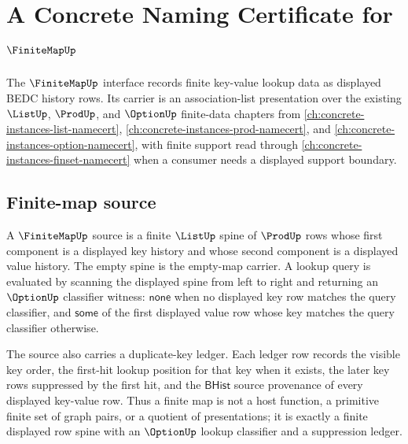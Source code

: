 \chapter{A Concrete Naming Certificate for $\FiniteMapUp$}
\label{ch:concrete-instances-finitemap-namecert}


The $\FiniteMapUp$ interface records finite key-value lookup data as displayed BEDC history rows. Its carrier is an association-list presentation over the existing $\ListUp$, $\ProdUp$, and $\OptionUp$ finite-data chapters from \autoref{ch:concrete-instances-list-namecert}, \autoref{ch:concrete-instances-prod-namecert}, and \autoref{ch:concrete-instances-option-namecert}, with finite support read through \autoref{ch:concrete-instances-finset-namecert} when a consumer needs a displayed support boundary.

\section{Finite-map source}
\label{sec:finitemap-source}

\begin{definition}
\label{def:finitemap-namecert-source}
A $\FiniteMapUp$ source is a finite $\ListUp$ spine of $\ProdUp$ rows whose first component is a displayed key history and whose second component is a displayed value history. The empty spine is the empty-map carrier. A lookup query is evaluated by scanning the displayed spine from left to right and returning an $\OptionUp$ classifier witness: $\mathsf{none}$ when no displayed key row matches the query classifier, and $\mathsf{some}$ of the first displayed value row whose key matches the query classifier otherwise.

The source also carries a duplicate-key ledger. Each ledger row records the visible key order, the first-hit lookup position for that key when it exists, the later key rows suppressed by the first hit, and the $\mathsf{BHist}$ source provenance of every displayed key-value row. Thus a finite map is not a host function, a primitive finite set of graph pairs, or a quotient of presentations; it is exactly a finite displayed row spine with an $\OptionUp$ lookup classifier and a suppression ledger.
\end{definition}

